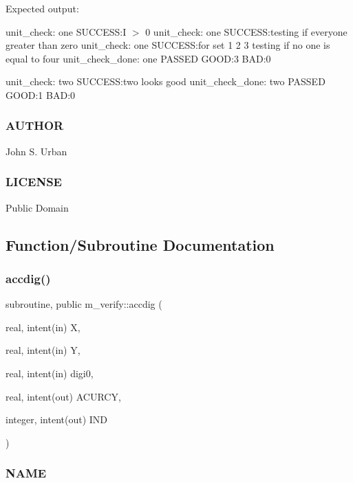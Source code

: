 Expected output\+:

unit\+\_\+check\+: one S\+U\+C\+C\+E\+SS\+:I $>$ 0 unit\+\_\+check\+: one S\+U\+C\+C\+E\+SS\+:testing if everyone greater than zero unit\+\_\+check\+: one S\+U\+C\+C\+E\+SS\+:for set 1 2 3 testing if no one is equal to four unit\+\_\+check\+\_\+done\+: one P\+A\+S\+S\+ED G\+O\+OD\+:3 B\+AD\+:0

unit\+\_\+check\+: two S\+U\+C\+C\+E\+SS\+:two looks good unit\+\_\+check\+\_\+done\+: two P\+A\+S\+S\+ED G\+O\+OD\+:1 B\+AD\+:0

\subsubsection*{A\+U\+T\+H\+OR}

John S. Urban \subsubsection*{L\+I\+C\+E\+N\+SE}

Public Domain 

\subsection{Function/\+Subroutine Documentation}
\mbox{\label{namespacem__verify_a311d01ea90882e4db1e87520ba731d5c}} 
\subsubsection{\texorpdfstring{accdig()}{accdig()}}
{\footnotesize\ttfamily subroutine, public m\+\_\+verify\+::accdig (\begin{DoxyParamCaption}\item[{real, intent(in)}]{X,  }\item[{real, intent(in)}]{Y,  }\item[{real, intent(in)}]{digi0,  }\item[{real, intent(out)}]{A\+C\+U\+R\+CY,  }\item[{integer, intent(out)}]{I\+ND }\end{DoxyParamCaption})}



\subsubsection*{N\+A\+ME}

